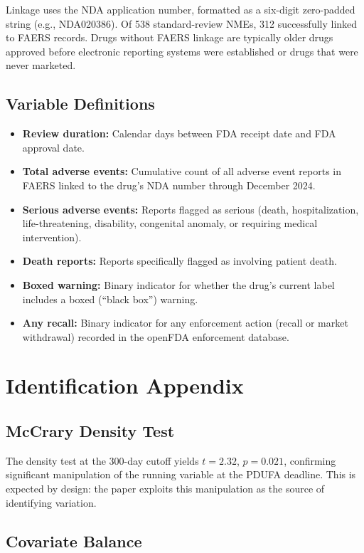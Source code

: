 \documentclass[12pt]{article}
\begin{document}
Linkage uses the NDA application number, formatted as a six-digit zero-padded string (e.g., NDA020386). Of 538 standard-review NMEs, 312 successfully linked to FAERS records. Drugs without FAERS linkage are typically older drugs approved before electronic reporting systems were established or drugs that were never marketed.

\subsection{Variable Definitions}

\begin{itemize}
\item \textbf{Review duration:} Calendar days between FDA receipt date and FDA approval date.
\item \textbf{Total adverse events:} Cumulative count of all adverse event reports in FAERS linked to the drug's NDA number through December 2024.
\item \textbf{Serious adverse events:} Reports flagged as serious (death, hospitalization, life-threatening, disability, congenital anomaly, or requiring medical intervention).
\item \textbf{Death reports:} Reports specifically flagged as involving patient death.
\item \textbf{Boxed warning:} Binary indicator for whether the drug's current label includes a boxed (``black box'') warning.
\item \textbf{Any recall:} Binary indicator for any enforcement action (recall or market withdrawal) recorded in the openFDA enforcement database.
\end{itemize}

\section{Identification Appendix}

\subsection{McCrary Density Test}

The \citet{cattaneo2020rddensity} density test at the 300-day cutoff yields $t = 2.32$, $p = 0.021$, confirming significant manipulation of the running variable at the PDUFA deadline. This is expected by design: the paper exploits this manipulation as the source of identifying variation.

\subsection{Covariate Balance}
\end{document}

